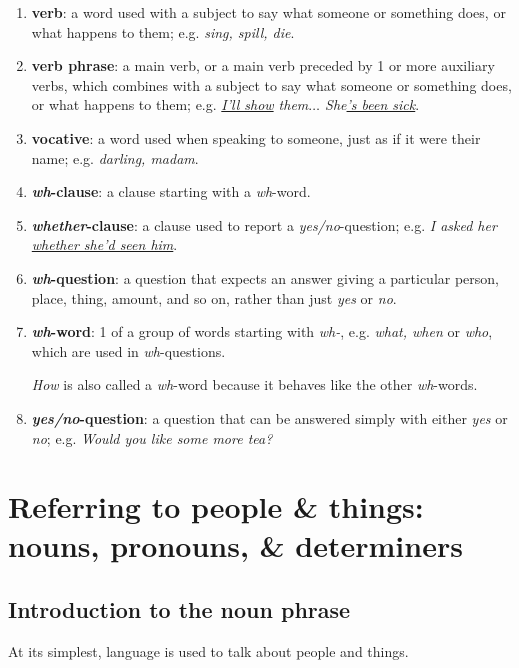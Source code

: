 \documentclass[oneside]{book}
\numberwithin{equation}{section}
\begin{document}
\begin{enumerate}
    Also called \textbf{uncount noun}.
    \item \textbf{verb}: a word used with a subject to say what someone or something does, or what happens to them; e.g. \textit{sing, spill, die}.
    \item \textbf{verb phrase}: a main verb, or a main verb preceded by 1 or more auxiliary verbs, which combines with a subject to say what someone or something does, or what happens to them; e.g. \textit{\underline{I'll show} them$\ldots$ She\underline{'s been sick}}.
    \item \textbf{vocative}: a word used when speaking to someone, just as if it were their name; e.g. \textit{darling, madam}.
    \item \textbf{\textit{wh}-clause}: a clause starting with a \textit{wh}-word.
    \item \textbf{\textit{whether}-clause}: a clause used to report a \textit{yes/no}-question; e.g. \textit{I asked her \underline{whether she'd seen him}}.
    \item \textbf{\textit{wh}-question}: a question that expects an answer giving a particular person, place, thing, amount, and so on, rather than just \textit{yes} or \textit{no}.
    \item \textbf{\textit{wh}-word}: 1 of a group of words starting with \textit{wh-}, e.g. \textit{what, when} or \textit{who}, which are used in \textit{wh}-questions.
    
    \textit{How} is also called a \textit{wh}-word because it behaves like the other \textit{wh}-words.
    \item \textbf{\textit{yes/no}-question}: a question that can be answered simply with either \textit{yes} or \textit{no}; e.g. \textit{Would you like some more tea?}
\end{enumerate}


\chapter{Referring to people \& things: nouns, pronouns, \& determiners}

\section{Introduction to the noun phrase}
 At its simplest, language is used to talk about people and things.
\end{document}
